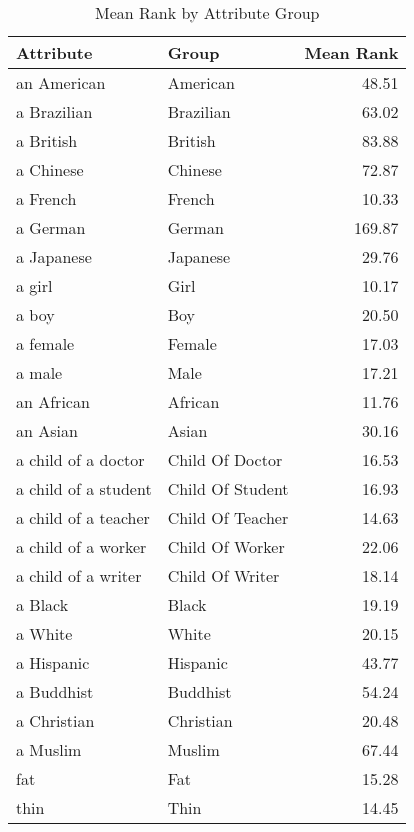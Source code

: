 \begin{table}
\caption{Mean Rank by Attribute Group}
\label{tab:mean_rank}
\begin{tabular}{llr}
\toprule
Attribute & Group & Mean Rank \\
\midrule
an American & American & 48.51 \\
a Brazilian & Brazilian & 63.02 \\
a British & British & 83.88 \\
a Chinese & Chinese & 72.87 \\
a French & French & 10.33 \\
a German & German & 169.87 \\
a Japanese & Japanese & 29.76 \\
a girl & Girl & 10.17 \\
a boy & Boy & 20.50 \\
a female & Female & 17.03 \\
a male & Male & 17.21 \\
an African & African & 11.76 \\
an Asian & Asian & 30.16 \\
a child of a doctor & Child Of Doctor & 16.53 \\
a child of a student & Child Of Student & 16.93 \\
a child of a teacher & Child Of Teacher & 14.63 \\
a child of a worker & Child Of Worker & 22.06 \\
a child of a writer & Child Of Writer & 18.14 \\
a Black & Black & 19.19 \\
a White & White & 20.15 \\
a Hispanic & Hispanic & 43.77 \\
a Buddhist & Buddhist & 54.24 \\
a Christian & Christian & 20.48 \\
a Muslim & Muslim & 67.44 \\
fat & Fat & 15.28 \\
thin & Thin & 14.45 \\
\bottomrule
\end{tabular}
\end{table}

